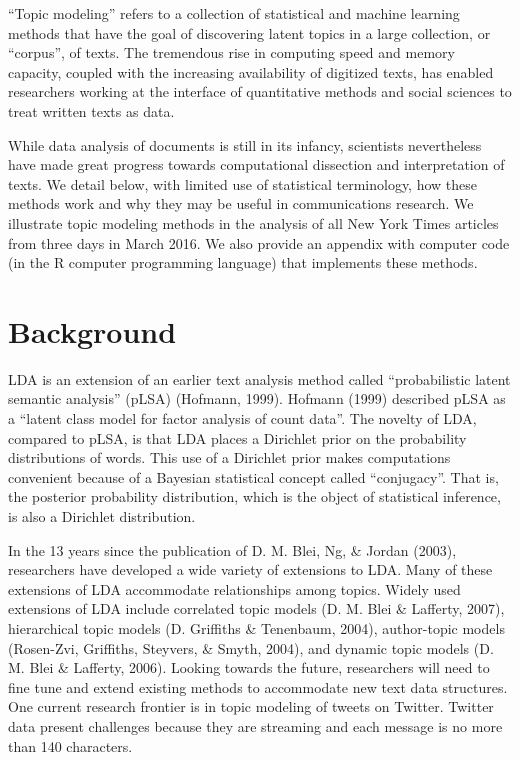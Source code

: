 \documentclass[12pt,]{article}
\begin{document}
``Topic modeling'' refers to a collection of statistical and machine
learning methods that have the goal of discovering latent topics in a
large collection, or ``corpus'', of texts. The tremendous rise in
computing speed and memory capacity, coupled with the increasing
availability of digitized texts, has enabled researchers working at the
interface of quantitative methods and social sciences to treat written
texts as data.

While data analysis of documents is still in its infancy, scientists
nevertheless have made great progress towards computational dissection
and interpretation of texts. We detail below, with limited use of
statistical terminology, how these methods work and why they may be
useful in communications research. We illustrate topic modeling methods
in the analysis of all New York Times articles from three days in March
2016. We also provide an appendix with computer code (in the R computer
programming language) that implements these methods.

\section{Background}\label{background}

LDA is an extension of an earlier text analysis method called
``probabilistic latent semantic analysis'' (pLSA) (Hofmann, 1999).
Hofmann (1999) described pLSA as a ``latent class model for factor
analysis of count data''. The novelty of LDA, compared to pLSA, is that
LDA places a Dirichlet prior on the probability distributions of words.
This use of a Dirichlet prior makes computations convenient because of a
Bayesian statistical concept called ``conjugacy''. That is, the
posterior probability distribution, which is the object of statistical
inference, is also a Dirichlet distribution.

In the 13 years since the publication of D. M. Blei, Ng, \& Jordan
(2003), researchers have developed a wide variety of extensions to LDA.
Many of these extensions of LDA accommodate relationships among topics.
Widely used extensions of LDA include correlated topic models (D. M.
Blei \& Lafferty, 2007), hierarchical topic models (D. Griffiths \&
Tenenbaum, 2004), author-topic models (Rosen-Zvi, Griffiths, Steyvers,
\& Smyth, 2004), and dynamic topic models (D. M. Blei \& Lafferty,
2006). Looking towards the future, researchers will need to fine tune
and extend existing methods to accommodate new text data structures. One
current research frontier is in topic modeling of tweets on Twitter.
Twitter data present challenges because they are streaming and each
message is no more than 140 characters.
\end{document}
